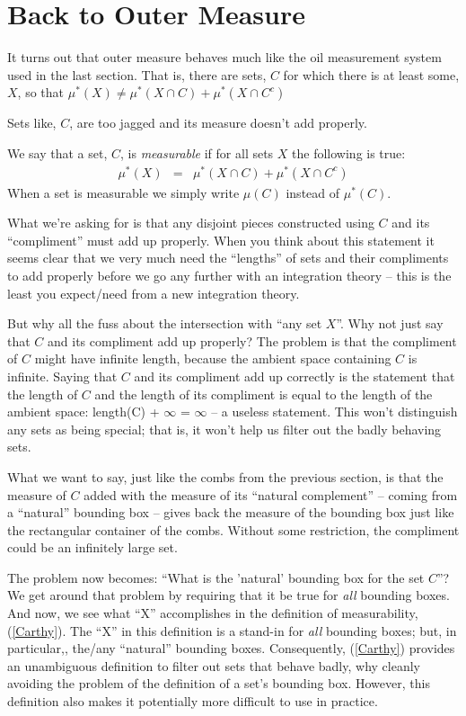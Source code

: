 \documentclass{article}
\begin{document}
\section{Back to Outer Measure}
It turns out that outer measure behaves much like the oil measurement system 
used in the last section. That is, there are sets, $C$ for which there is at 
least some, $X$, so that
$\mu^*(X) \neq \mu^*(X \cap C) + \mu^*(X \cap C^c)$

Sets like, $C$, are too jagged and its measure doesn't add properly.

We say that a set, $C$, is {\em measurable\/}
if for all sets $X$ the following is true:
\begin{eqnarray}
	\mu^*(X) & = & \mu^*(X \cap C) + \mu^*(X \cap C^c) \label{Carthy}
\end{eqnarray}
When a set is measurable we simply write $\mu(C)$ instead of $\mu^*(C)$.

What we're asking for is that any disjoint pieces constructed using $C$ and 
its ``compliment'' must add up properly. When you think about this statement it
seems clear that we very much need the ``lengths'' of sets and their compliments
to add properly before we go any further with an integration theory -- this 
is the least you expect/need from a new integration theory.

But why all the fuss about the intersection with ``any set $X$''.
Why not just say that $C$ and its compliment add up properly?
The problem is that the compliment of $C$ might have infinite length, because
the ambient space containing $C$ is infinite.
Saying that $C$ and its compliment add up correctly is the statement that 
the length of $C$ and the length of its compliment is equal to the length 
of the ambient space: length(C) + $\infty$ = $\infty$ -- a useless statement.
This won't distinguish any sets as being special; that is, it won't help
us filter out the badly behaving sets.

What we want to say, just like the combs from the
previous section, is that the measure of $C$ added with the measure of its 
``natural complement'' -- coming from a ``natural'' bounding box -- 
gives back the measure of the bounding box just like the rectangular
container of the combs. Without some restriction, the compliment could be 
an infinitely large set.

The problem now becomes: ``What is the 'natural' bounding box for the set $C$''?
We get around that problem by requiring that it be true for {\em all\/} bounding boxes.
And now, we see what ``X'' accomplishes in the definition of measurability, (\ref{Carthy}).
The ``X'' in this definition is a stand-in for {\em all\/} bounding boxes; but, in particular,,
the/any ``natural'' bounding boxes.
Consequently, (\ref{Carthy}) provides an unambiguous definition to filter out 
sets that behave badly, why cleanly avoiding 
the problem of the definition of a set's bounding box.
However, this definition also makes it potentially more difficult to use in practice.
\end{document}
